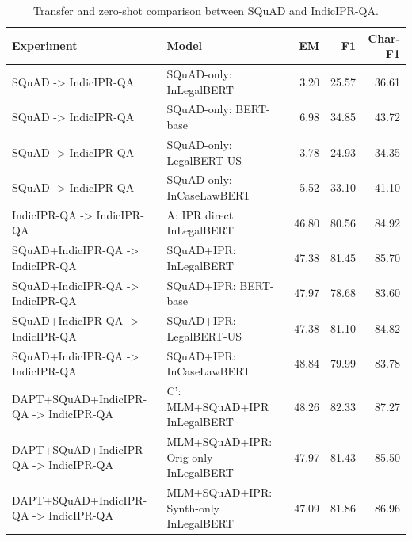 \begin{table}[htbp]
\centering
\caption{Transfer and zero-shot comparison between SQuAD and IndicIPR-QA.}
\label{tab:transfer_comparison}
\scriptsize
\begin{tabular}{llrrr}
\toprule
Experiment & Model & EM & F1 & Char-F1 \\
\midrule
SQuAD -> IndicIPR-QA & SQuAD-only: InLegalBERT & 3.20 & 25.57 & 36.61 \\
SQuAD -> IndicIPR-QA & SQuAD-only: BERT-base & 6.98 & 34.85 & 43.72 \\
SQuAD -> IndicIPR-QA & SQuAD-only: LegalBERT-US & 3.78 & 24.93 & 34.35 \\
SQuAD -> IndicIPR-QA & SQuAD-only: InCaseLawBERT & 5.52 & 33.10 & 41.10 \\
IndicIPR-QA -> IndicIPR-QA & A: IPR direct InLegalBERT & 46.80 & 80.56 & 84.92 \\
SQuAD+IndicIPR-QA -> IndicIPR-QA & SQuAD+IPR: InLegalBERT & 47.38 & 81.45 & 85.70 \\
SQuAD+IndicIPR-QA -> IndicIPR-QA & SQuAD+IPR: BERT-base & 47.97 & 78.68 & 83.60 \\
SQuAD+IndicIPR-QA -> IndicIPR-QA & SQuAD+IPR: LegalBERT-US & 47.38 & 81.10 & 84.82 \\
SQuAD+IndicIPR-QA -> IndicIPR-QA & SQuAD+IPR: InCaseLawBERT & 48.84 & 79.99 & 83.78 \\
DAPT+SQuAD+IndicIPR-QA -> IndicIPR-QA & C': MLM+SQuAD+IPR InLegalBERT & 48.26 & 82.33 & 87.27 \\
DAPT+SQuAD+IndicIPR-QA -> IndicIPR-QA & MLM+SQuAD+IPR: Orig-only InLegalBERT & 47.97 & 81.43 & 85.50 \\
DAPT+SQuAD+IndicIPR-QA -> IndicIPR-QA & MLM+SQuAD+IPR: Synth-only InLegalBERT & 47.09 & 81.86 & 86.96 \\
\bottomrule
\end{tabular}
\end{table}
